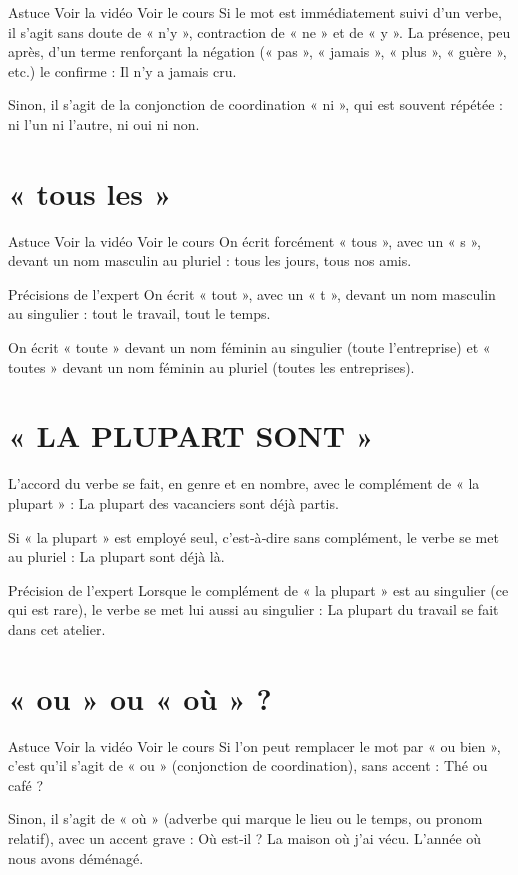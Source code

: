 Astuce Voir la vidéo Voir le cours
Si le mot est immédiatement suivi d'un verbe, il s'agit sans doute de « n'y », contraction de « ne » et de « y ». La présence, peu après, d'un terme renforçant la négation (« pas », « jamais », « plus », « guère », etc.) le confirme : Il n'y a jamais cru.

Sinon, il s'agit de la conjonction de coordination « ni », qui est souvent répétée : ni l'un ni l'autre, ni oui ni non.

\section{« tous les »}

Astuce Voir la vidéo Voir le cours
On écrit forcément « tous », avec un « s », devant un nom masculin au pluriel : tous les jours, tous nos amis.

Précisions de l'expert
On écrit « tout », avec un « t », devant un nom masculin au singulier : tout le travail, tout le temps.

On écrit « toute » devant un nom féminin au singulier (toute l'entreprise) et « toutes » devant un nom féminin au pluriel (toutes les entreprises).

\section{« LA PLUPART SONT »}

L'accord du verbe se fait, en genre et en nombre, avec le complément de « la plupart » : La plupart des vacanciers sont déjà partis.

Si « la plupart » est employé seul, c'est‑à‑dire sans complément, le verbe se met au pluriel : La plupart sont déjà là.

Précision de l'expert
Lorsque le complément de « la plupart » est au singulier (ce qui est rare), le verbe se met lui aussi au singulier : La plupart du travail se fait dans cet atelier.

\section{« ou » ou « où » ?}

Astuce Voir la vidéo Voir le cours
Si l'on peut remplacer le mot par « ou bien », c'est qu'il s'agit de « ou » (conjonction de coordination), sans accent : Thé ou café ?

Sinon, il s'agit de « où » (adverbe qui marque le lieu ou le temps, ou pronom relatif), avec un accent grave : Où est‑il ? La maison où j'ai vécu. L'année où nous avons déménagé.


